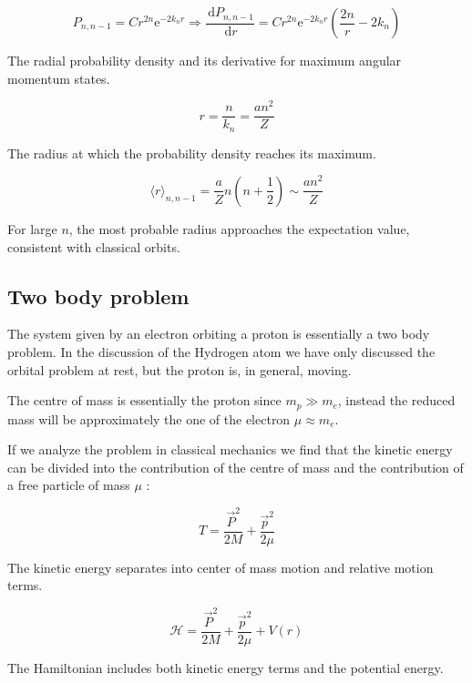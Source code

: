\documentclass[italian]{HKNdocument}
\begin{document}
\begin{equation}
P_{n, n-1}=C r^{2 n} \mathrm{e}^{-2 k_{n} r} \Longrightarrow \frac{\, \mathrm{d} P_{n, n-1}}{\, \mathrm{d} r}=C r^{2 n} \mathrm{e}^{-2 k_{n} r}\left(\frac{2 n}{r}-2 k_{n}\right)
\end{equation}

The radial probability density and its derivative for maximum angular momentum states.

\begin{equation}
r=\frac{n}{k_{n}}=\frac{a n^{2}}{Z}
\end{equation}

The radius at which the probability density reaches its maximum.

\begin{equation}
\langle r\rangle_{n, n-1}=\frac{a}{Z} n\left(n+\frac{1}{2}\right) \sim \frac{a n^{2}}{Z}
\end{equation}

For large $n$, the most probable radius approaches the expectation value, consistent with classical orbits.

\subsection{Two body problem}
The system given by an electron orbiting a proton is essentially a two body problem. In the discussion of the Hydrogen atom we have only discussed the orbital problem at rest, but the proton is, in general, moving.

The centre of mass is essentially the proton since $m_{p} \gg m_{e}$, instead the reduced mass will be approximately the one of the electron $\mu \approx m_{e}$.

If we analyze the problem in classical mechanics we find that the kinetic energy can be divided into the contribution of the centre of mass and the contribution of a free particle of mass $\mu$ :

\begin{equation}
T=\frac{\vec{P}^{2}}{2 M}+\frac{\vec{p}^{2}}{2 \mu}
\end{equation}

The kinetic energy separates into center of mass motion and relative motion terms.

\begin{equation}
\mathcal{H}=\frac{\vec{P}^{2}}{2 M}+\frac{\vec{p}^{2}}{2 \mu}+V(r)
\end{equation}

The Hamiltonian includes both kinetic energy terms and the potential energy.
\end{document}

